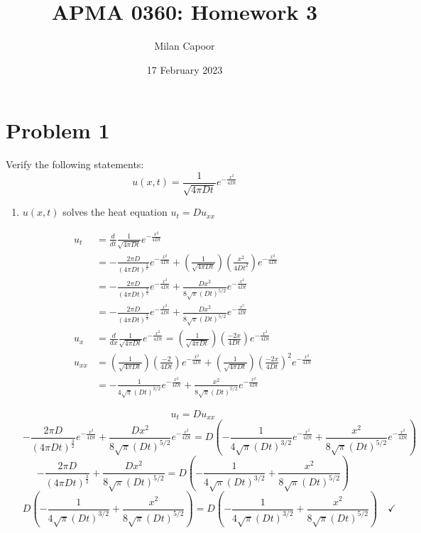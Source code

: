 \documentclass[12pt]{article}
\title{APMA 0360: Homework 3}
\author{Milan Capoor}
\date{17 February 2023}
\begin{document}
\maketitle
\section*{Problem 1}
Verify the following statements:
\[u(x, t) = \frac{1}{\sqrt{4\pi Dt}}e^{-\frac{x^2}{4Dt}}\]
\begin{enumerate}
    \item $u(x, t)$ solves the heat equation $u_t = Du_{xx}$
    
    \color{blue}
    \begin{align*}
        u_t &= \frac{d}{dt} \frac{1}{\sqrt{4\pi Dt}}e^{-\frac{x^2}{4Dt}}\\
        &= -\frac{2\pi D}{(4\pi Dt)^{\frac{3}{2}}}e^{-\frac{x^2}{4Dt}} + \left(\frac{1}{\sqrt{4\pi Dt}}\right) \left(\frac{x^2}{4Dt^2}\right) e^{-\frac{x^2}{4Dt}}\\
        &= -\frac{2\pi D}{(4\pi Dt)^{\frac{3}{2}}}e^{-\frac{x^2}{4Dt}} + \frac{Dx^2}{8\sqrt{\pi}(Dt)^{5/2}}e^{-\frac{x^2}{4Dt}}\\
        &= -\frac{2\pi D}{(4\pi Dt)^{\frac{3}{2}}}e^{-\frac{x^2}{4Dt}} + \frac{Dx^2}{8\sqrt{\pi} (Dt)^{5/2}}e^{-\frac{x^2}{4Dt}}\\
        u_x &= \frac{d}{dx} \frac{1}{\sqrt{4\pi Dt}}e^{-\frac{x^2}{4Dt}} = \left(\frac{1}{\sqrt{4\pi Dt}}\right)\left(\frac{-2x}{4Dt}\right)e^{-\frac{x^2}{4Dt}} \\
        u_{xx} &= \left(\frac{1}{\sqrt{4\pi Dt}}\right)\left(\frac{-2}{4Dt}\right)e^{-\frac{x^2}{4Dt}} + \left(\frac{1}{\sqrt{4\pi Dt}}\right)\left(\frac{-2x}{4Dt}\right)^2 e^{-\frac{x^2}{4Dt}}\\
        &= -\frac{1}{4\sqrt{\pi}(Dt)^{3/2}}e^{-\frac{x^2}{4Dt}} + \frac{x^2}{8\sqrt{\pi}(Dt)^{5/2}}e^{-\frac{x^2}{4Dt}}
    \end{align*}

    \[u_t = Du_{xx}\]
    \[-\frac{2\pi D}{(4\pi Dt)^{\frac{3}{2}}}e^{-\frac{x^2}{4Dt}} + \frac{Dx^2}{8\sqrt{\pi} (Dt)^{5/2}}e^{-\frac{x^2}{4Dt}} = D(-\frac{1}{4\sqrt{\pi}(Dt)^{3/2}}e^{-\frac{x^2}{4Dt}} + \frac{x^2}{8\sqrt{\pi}(Dt)^{5/2}}e^{-\frac{x^2}{4Dt}})\]
    \[-\frac{2\pi D}{(4\pi Dt)^{\frac{3}{2}}} + \frac{Dx^2}{8\sqrt{\pi} (Dt)^{5/2}} = D(-\frac{1}{4\sqrt{\pi}(Dt)^{3/2}} + \frac{x^2}{8\sqrt{\pi}(Dt)^{5/2}})\]
    \[D(-\frac{1}{4\sqrt{\pi}(Dt)^{3/2}} + \frac{x^2}{8\sqrt{\pi} (Dt)^{5/2}}) = D(-\frac{1}{4\sqrt{\pi}(Dt)^{3/2}} + \frac{x^2}{8\sqrt{\pi}(Dt)^{5/2}}) \quad \checkmark\]


\end{enumerate}
\end{document}
